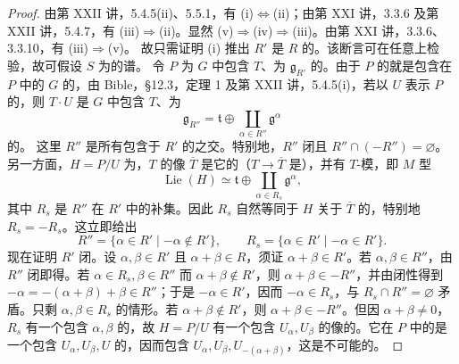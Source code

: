 \begin{proof}
由第 XXII 讲，5.4.5(ii)、5.5.1，有 (i)$\Leftrightarrow$(ii)；由第 XXI 讲，3.3.6 及第 XXII 讲，5.4.7，有 (iii)$\Rightarrow$(ii)。显然 (v)$\Rightarrow$(iv)$\Rightarrow$(iii)。由第 XXI 讲，3.3.6、3.3.10，有 (iii)$\Rightarrow$(v)。
故只需证明 (i) 推出 $R'$ 是 $R$ 的。该断言可在任意上检验，故可假设 $S$ 为的谱。
令 $P$ 为 $G$ 中包含 $T$、为 $\mathfrak g_{R'}$ 的。由于 $P$ 的就是包含在 $P$ 中的 $G$ 的，由 Bible，§12.3，定理 1 及第 XXII 讲，5.4.5(i)，若以 $U$ 表示 $P$ 的，则 $T\cdot U$ 是 $G$ 中包含 $T$、为
\[\mathfrak g_{R''}=\mathfrak t\oplus\coprod_{\alpha\in R''}\mathfrak g^\alpha\]
的。
这里 $R''$ 是所有包含于 $R'$ 的之交。特别地，$R''$ 闭且 $R''\cap(-R'')=\varnothing$。另一方面，$H=P/U$ 为，$T$ 的像 $\overline T$ 是它的（$T\to\overline T$ 是），并有 $T$-模，即 $M$ 型
\[\operatorname{Lie}(H)\simeq\mathfrak t\oplus\coprod_{\alpha\in R_s}\mathfrak g^\alpha,\]
其中 $R_s$ 是 $R''$ 在 $R'$ 中的补集。因此 $R_s$ 自然等同于 $H$ 关于 $\overline T$ 的，特别地 $R_s=-R_s$。这立即给出
\[R''=\{\alpha\in R'\mid-\alpha\notin R'\},\qquad R_s=\{\alpha\in R'\mid-\alpha\in R'\}.\]
现在证明 $R'$ 闭。设 $\alpha,\beta\in R'$ 且 $\alpha+\beta\in R$，须证 $\alpha+\beta\in R'$。若 $\alpha,\beta\in R''$，由 $R''$ 闭即得。若 $\alpha\in R_s,\beta\in R''$ 而 $\alpha+\beta\notin R'$，则 $\alpha+\beta\in-R''$，并由闭性得到 $-\alpha=-(\alpha+\beta)+\beta\in R''$；于是 $-\alpha\in R'$，因而 $-\alpha\in R_s$，与 $R_s\cap R''=\varnothing$ 矛盾。只剩 $\alpha,\beta\in R_s$ 的情形。若 $\alpha+\beta\notin R'$，则 $\alpha+\beta\in-R''$。但因 $\alpha+\beta\ne0$， $R_s$ 有一个包含 $\alpha,\beta$ 的，故 $H=P/U$ 有一个包含 $U_\alpha,U_\beta$ 的像的。它在 $P$ 中的是一个包含 $U_\alpha,U_\beta,U$ 的，因而包含 $U_\alpha,U_\beta,U_{-(\alpha+\beta)}$，这是不可能的。
\end{proof}
